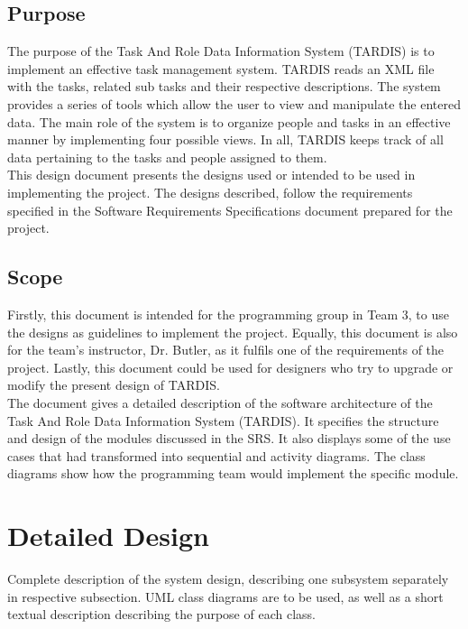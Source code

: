\documentclass[12pt]{article}
\begin{document}
\subsection{Purpose}

The purpose of the Task And Role Data Information System (TARDIS) is to implement an effective task management system.
 TARDIS reads an XML file with the tasks, related sub tasks and their respective descriptions. The system provides a series of tools
which allow the user to view and manipulate the entered data. The main role of the system is to organize people and tasks in 
an effective manner by implementing four possible views. In all, TARDIS keeps track of all data pertaining to the tasks and people assigned
to them.
\\[20px]This design document presents the designs used or intended to be used in implementing the project. The designs described, follow the requirements specified in the Software Requirements Specifications document prepared for the project.
\subsection{Scope}
 Firstly, this document is intended for the programming group in Team 3, to use the designs as guidelines to implement the project. Equally, this document is  also for the team's instructor, Dr. Butler, as it fulfils one of the requirements of the project. Lastly, this document could be used for designers who try to upgrade or modify the present design of TARDIS.
\\[20px]The document gives a detailed description of the software architecture of the Task And Role Data Information System (TARDIS).
 It specifies the structure and design  of the modules discussed in the SRS. It also displays some of the use
 cases that had transformed into sequential and activity diagrams. The class diagrams show how the programming team would implement
 the specific module. 




\section{Detailed Design} \label{sec:detail}

Complete description of the system design, describing one subsystem separately in respective subsection.
UML class diagrams are to be used, as well as a short textual description describing the purpose of each class.







\end{document}
